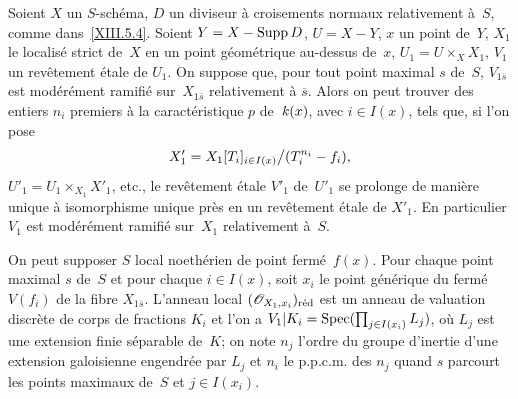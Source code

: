 \begin{proposition}
\label{XIII.5.5}
Soient $X$ un $S$-sch\'ema, $D$ un
diviseur \`a croisements normaux relativement \`a~$S$, comme
dans~\eqref{XIII.5.4}. Soient $Y=X-\operatorname{Supp} D$,
$U=X- Y$, $x$ un point de~$Y$, $X_{1}$ le localis\'e
strict de~$X$ en un point g\'eom\'etrique au-dessus de~$x$,
$U_{1}=U\times_{X}X_{1}$, $V_{1}$ un rev\^etement \'etale de
$U_{1}$. On suppose que, pour tout point maximal $s$ de~$S$,
$V_{1\overline{s}}$ est mod\'er\'ement ramifi\'e sur~$X_{1\overline{s}}$ relativement \`a $\overline{s}$. Alors on peut
trouver des entiers $n_{i}$ premiers \`a la caract\'eristique $p$
de~$\mathit{k}(x)$, avec $i\in I(x)$, tels que, si l'on pose
$$
X'_{1}=X_{1}[T_{i}]_{i\in I(x)}\big/ (T_{i}^{n_{i}}-f_{i}) ,
$$
$U'_{1}=U_{1}\times_{X_{1}}X'_{1}$, etc., le rev\^etement \'etale
$V'_{1}$ de~$U'_{1}$ se prolonge de mani\`ere unique \`a
isomorphisme unique pr\`es en un rev\^etement \'etale de
$X'_{1}$. En particulier
$V_{1}$ est mod\'er\'ement ramifi\'e sur~$X_{1}$ relativement
\`a~$S$.
\end{proposition}

On peut supposer $S$ local noeth\'erien de point ferm\'e~$f(x)$.
Pour chaque point maximal $s$ de~$S$ et pour chaque $i\in I(x)$, soit
$x_{i}$ le point g\'en\'erique du ferm\'e $V(f_{i})$ de la fibre
$X_{1\overline{s}}$. L'anneau local $(\cal{O}_{X_{1},x_{i}})_{\red}$
est un anneau de valuation discr\`ete de corps de fractions $K_{i}$
et l'on a
$V_{1}|K_{i}=\operatorname{Spec}(\prod_{j\in I(x_{i})}L_{j})$,
o\`u $L_{j}$ est une extension finie s\'eparable de~$K$; on note
$n_{j}$ l'ordre du groupe d'inertie d'une extension galoisienne
engendr\'ee par $L_{j}$ et $n_{i}$ le p.p.c.m. des $n_{j}$ quand
$s$ parcourt les points maximaux de~$S$ et
$j\in I(x_{i})$.

